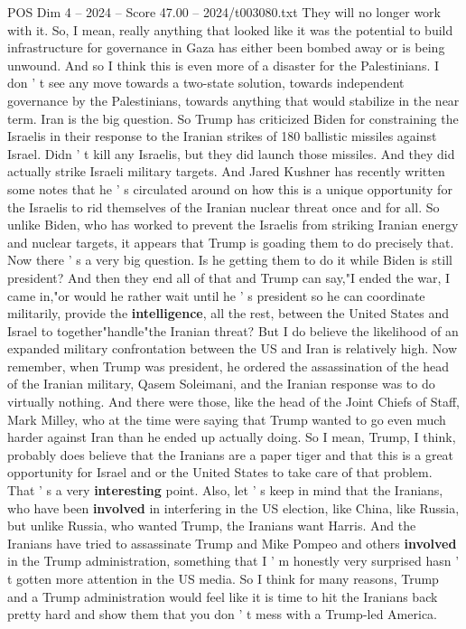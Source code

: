 \begin{textsample}{POS Dim 4 – 2024 – Score 47.00 – 2024/t003080.txt}
They will no longer work with it.
So, I mean, really anything that looked like it was the potential to build infrastructure for governance in Gaza has either been bombed away or is being unwound.
And so I think this is even more of a disaster for the Palestinians.
I don ' t see any move towards a two-state solution, towards independent governance by the Palestinians, towards anything that would stabilize in the near term.
Iran is the big question.
So Trump has criticized Biden for constraining the Israelis in their response to the Iranian strikes of 180 ballistic missiles against Israel.
Didn ' t kill any Israelis, but they did launch those missiles.
And they did actually strike Israeli military targets.
And Jared Kushner has recently written some notes that he ' s circulated around on how this is a unique opportunity for the Israelis to rid themselves of the Iranian nuclear threat once and for all.
So unlike Biden, who has worked to prevent the Israelis from striking Iranian energy and nuclear targets, it appears that Trump is goading them to do precisely that.
Now there ' s a very big question.
Is he getting them to do it while Biden is still president?
And then they end all of that and Trump can say,"I ended the war, I came in,"or would he rather wait until he ' s president so he can coordinate militarily, provide the \textbf{intelligence}, all the rest, between the United States and Israel to together"handle"the Iranian threat?
But I do believe the likelihood of an expanded military confrontation between the US and Iran is relatively high.
Now remember, when Trump was president, he ordered the assassination of the head of the Iranian military, Qasem Soleimani, and the Iranian response was to do virtually nothing.
And there were those, like the head of the Joint Chiefs of Staff, Mark Milley, who at the time were saying that Trump wanted to go even much harder against Iran than he ended up actually doing.
So I mean, Trump, I think, probably does believe that the Iranians are a paper tiger and that this is a great opportunity for Israel and or the United States to take care of that problem.
That ' s a very \textbf{interesting} point.
Also, let ' s keep in mind that the Iranians, who have been \textbf{involved} in interfering in the US election, like China, like Russia, but unlike Russia, who wanted Trump, the Iranians want Harris.
And the Iranians have tried to assassinate Trump and Mike Pompeo and others \textbf{involved} in the Trump administration, something that I ' m honestly very surprised hasn ' t gotten more attention in the US media.
So I think for many reasons, Trump and a Trump administration would feel like it is time to hit the Iranians back pretty hard and show them that you don ' t mess with a Trump-led America.

\end{textsample}
